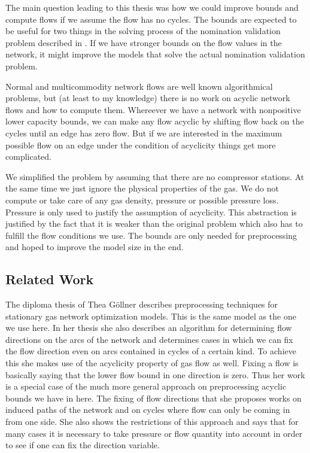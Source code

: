 The main question leading to this thesis was how we could improve bounds and compute flows if we assume the flow has no 
cycles. 
The bounds are expected to be useful for two things in the solving process of the nomination validation problem 
described in \cite{PfetschFuegenschuhGeissleretal.2012}. If we have stronger bounds on the flow values in the network, 
it might improve the models that solve the actual nomination validation problem. 




Normal and multicommodity network flows are well known algorithmical problems, but (at least to my 
knowledge) there is no work on acyclic network flows and how to compute them. 
Whereever we have a network with nonpositive lower capacity bounds, we can make any flow acyclic by shifting flow 
back on the cycles until an edge has zero flow. But if we are interested in the maximum possible flow on an edge under 
the condition of acyclicity things get more complicated. 

We simplified the problem by assuming that there are no compressor stations. At the same time we just ignore the 
physical properties of the gas. We do not compute or take care of any gas density, pressure or possible pressure loss. 
Pressure is only used to justify the assumption of acyclicity. This abstraction is justified by the fact that it is 
weaker than the original problem which also has to fulfill the flow conditions we use. The bounds are only needed 
for preprocessing and hoped to improve the model size in the end. 

\subsection{Related Work}
The diploma thesis of Thea Göllner \cite{DiplomarbeitTheaGoellner} describes preprocessing techniques for stationary gas 
network optimization models. This is the same model as the one we use here. In her thesis she also describes an 
algorithm for determining flow directions on the arcs of the network and determines cases in which we can fix the flow 
direction even on arcs contained in cycles of a certain kind. To achieve this she makes use of the acyclicity property 
of gas flow as well. 
Fixing a flow is basically saying that the lower flow bound in one direction is zero. Thus her work is a special case 
of the much more general approach on preprocessing acyclic bounds we have in here. The fixing of flow directions that 
she proposes works on induced paths of the network and on cycles where flow can only be coming in from one side. 
She also shows the restrictions of this approach and says that for many cases it is necessary to take pressure or flow 
quantity into account in order to see if one can fix the direction variable. 

